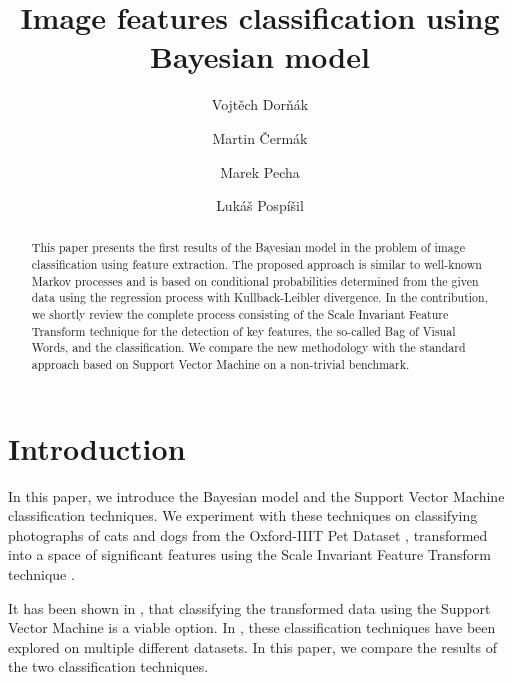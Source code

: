 \documentclass{aip-cp}
\begin{document}
\title{Image features classification using Bayesian model}

\author[aff1,aff2]{Vojt\v{e}ch Dor\v{n}\'{a}k}
\author[aff1,aff2]{Martin \v{C}erm\'{a}k}
\author[aff2]{Marek Pecha}
\author[aff1]{Luk\'{a}\v{s} Posp\'{i}\v{s}il}


\maketitle

\begin{abstract}
    This paper presents the first results of the Bayesian model in the problem of image classification using feature extraction. The proposed approach is similar to well-known Markov processes and is based on conditional probabilities determined from the given data using the regression process with Kullback-Leibler divergence. In the contribution, we shortly review the complete process consisting of the Scale Invariant Feature Transform technique for the detection of key features, the so-called Bag of Visual Words, and the classification. We compare the new methodology with the standard approach based on Support Vector Machine on a non-trivial benchmark.
\end{abstract}

\maketitle

\section{Introduction}
In this paper, we introduce the Bayesian model and the Support Vector Machine classification techniques. We experiment with these techniques on classifying photographs of cats and dogs from the Oxford-IIIT Pet Dataset \cite{parkhi12a}, transformed into a space of significant features using the Scale Invariant Feature Transform technique \cite{Lowe2004}.

It has been shown in \cite{dornak2020}, that classifying the transformed data using the Support Vector Machine is a viable option. In \cite{dornak2021}, these classification techniques have been explored on multiple different datasets. In this paper, we compare the results of the two classification techniques.
\end{document}
